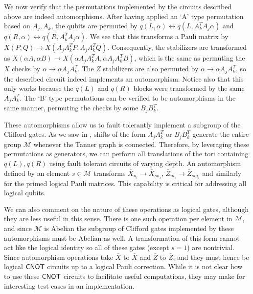 \documentclass{article}
\begin{document}
 
We now verify that the permutations implemented by the circuits described above are indeed automorphisms. After having applied an `A' type permutation based on $A_j,A_k$, the qubits are permuted by $q(L, \alpha) \leftrightarrow q(L,A^T_k A_j \alpha )$ and $q(R, \alpha) \leftrightarrow q(R,A^T_{k}A_{j}\alpha )$. We see that this transforms a Pauli matrix by $X(P,Q) \to X( A_j A_k^T P, A_j A_k^T Q  )$. Consequently, the stabilizers are transformed as $X(\alpha A, \alpha B) \to X(\alpha  A_j A_k^T A, \alpha A_j A_k^T B  )$, which is the same as permuting the $X$ checks by $\alpha \to \alpha A_j A_k^T$. The $Z$ stabilizers are also permuted by $\alpha \to \alpha A_j A_k^T$, so the described circuit indeed implements an automorphism. Notice also that this only works because the $q(L)$ and $q(R)$ blocks were transformed by the same $A_j A_k^T$. The `B' type permutations can be verified to be automorphisms in the same manner, permuting the checks by some $B_jB_k^T$.

These automorphisms allow us to fault tolerantly implement a subgroup of the Clifford gates. As we saw in , shifts of the form $A_j A_k^T$ or $B_jB_k^T$ generate the entire group $\mathcal{M}$ whenever the Tanner graph is connected.
Therefore, by leveraging these permutations as generators, we can perform all translations of the tori containing $q(L), q(R)$ using fault tolerant circuits of varying depth. An automorphism defined by an element $s \in \mathcal{M}$ transforms $\bar X_{n_i} \to \bar X_{sn_i}$, $\bar Z_{m_i} \to \bar Z_{sm_i}$ and similarly for the primed logical Pauli matrices.  This capability is critical for addressing all logical qubits.

We can also comment on the nature of these operations as logical gates, although they are less useful in this sense. There is one such operation per element in $\mathcal{M}$, and since $\mathcal{M}$ is Abelian the subgroup of Clifford gates implemented by these automorphisms must be Abelian as well.  A transformation of this form cannot act like the logical identity so all of these gates (except $s= 1$) are nontrivial. Since automorphism operations take $\bar X$ to $\bar X$ and $\bar Z$ to $\bar Z$, and they must hence be logical $\mathsf{CNOT}$ circuits up to a logical Pauli correction. While it is not clear how to use these $\mathsf{CNOT}$ circuits to facilitate useful computations, they may make for interesting test cases in an implementation.
\end{document}

